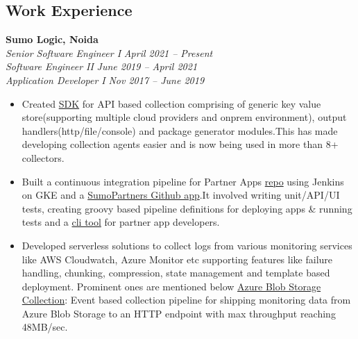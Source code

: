 \documentclass[margin,line]{resume}
\begin{document}
\begin{resume}
    \section{\mysidestyle Work Experience}
    \textbf{Sumo Logic, Noida}\\
        \textsl{Senior Software Engineer I} \hfill \textsl{April 2021 -- Present}\vspace{0mm}\\\vspace{0mm}%
        \textsl{Software Engineer II} \hfill \textsl{June 2019 -- April 2021}\vspace{0mm}\\\vspace{0mm}%
        \textsl{Application Developer I} \hfill \textsl{Nov 2017 -- June 2019}\vspace{1mm}%
        \begin{itemize}
            \item Created \href{https://pypi.org/project/sumologic-appclient-sdk/}{SDK} for API based collection comprising of generic key value store(supporting multiple cloud providers and onprem environment), output handlers(http/file/console) and package generator modules.This has made developing collection agents easier and is now being used in more than 8+ collectors.
            \item Built a continuous integration pipeline for Partner Apps \href{https://github.com/SumoLogic/sumologic-public-partner-apps}{repo} using Jenkins on GKE and a  \href{https://github.com/apps/sumopartners}{SumoPartners Github app}.It involved writing unit/API/UI tests, creating groovy based pipeline definitions for deploying apps \& running tests and a \href{https://pypi.org/project/sumologic-apptestutils/}{cli tool} for partner app developers.
            \item Developed serverless solutions to collect logs from various monitoring services like AWS Cloudwatch, Azure Monitor etc supporting features like failure handling, chunking, compression, state management and template based deployment. Prominent ones are mentioned below 
            \subitem \href{https://help.sumologic.com/Send-Data/Collect-from-Other-Data-Sources/Azure_Blob_Storage}{Azure Blob Storage Collection}: Event based collection pipeline for shipping monitoring
data from Azure Blob Storage to an HTTP endpoint with max throughput reaching 48MB/sec.

\end{itemize}
\end{resume}
\end{document}
